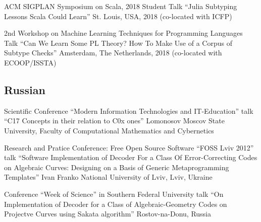 \documentclass[11pt,a4paper]{moderncv}   %
\newcommand{\CPP}
{C\nolinebreak[4]\hspace{-.05em}\raisebox{.35ex}{\scriptsize\bfseries +\hspace{-.05em}+}}
\newcommand{\MyHrefImpl}[2]{%
\textcolor{blue}{\href{#1}{#2}}}
\def\LINKS{}
\newcommand*{\myhref}[2]{%
\ignorespaces%
\ifdefined\LINKS%
\MyHrefImpl{#1}{#2}%
\else%
#2%
\fi%
}
\begin{document}
%
    {ACM SIGPLAN Symposium on Scala, 2018}%
    {Student Talk ``Julia Subtyping Lessons Scala Could Learn''}
    {St. Louis, USA, 2018 (co-located with ICFP)}{}%
    {%
    }


%
    {2nd Workshop on Machine Learning Techniques for Programming Languages}%
    {Talk ``Can We Learn Some PL Theory? How To Make Use of a Corpus of Subtype Checks''}
    {Amsterdam, The Netherlands, 2018 (co-located with ECOOP/ISSTA)}{}%
    {%
    }

{\footnotesize
\subsection{Russian}

%
    {Scientific Conference “Modern Information Technologies and IT-Education”}%
    {talk “\protect\CPP{}17 Concepts in their relation to \protect\CPP{}0x ones”}
    {Lomonosov Moscov State University, Faculty of Computational Mathematics and Cybernetics}{}%
    {%
    }

%
    {Research and Pratice Conference: Free Open Source Software “FOSS Lviv 2012”}%
    {talk “Software Implementation of Decoder For a Class Of Error-Correcting Codes on Algebraic Curves: Designing on a Basis of Generic Metaprogramming Templates”}%
    {Ivan Franko National University of Lviv, Lviv, Ukraine}{}%
    {%
    }

%
    {Conference “Week of Science” in Southern Federal University}%
    {talk “On Implementation of Decoder for a Class of Algebraic-Geometry Codes on Projectve Curves using Sakata algorithm”}%
    {Rostov-na-Donu, Russia}{}%
    {%
    }
}
\end{document}
